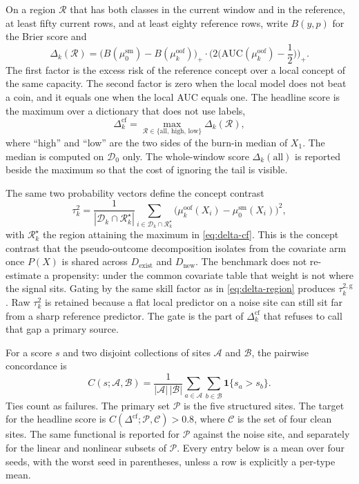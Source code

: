 On a region $\mathcal{R}$ that has both classes in the current window and
in the reference, at least fifty current rows, and at least eighty
reference rows, write $B(y,p)$ for the Brier score and
\begin{equation}
\label{eq:delta-region}
\Delta_k(\mathcal{R})
=
\Big(B(\mu_0^{\mathrm{sm}})-B(\mu_k^{\mathrm{oof}})\Big)_+
\cdot
\Big(2\big(\mathrm{AUC}(\mu_k^{\mathrm{oof}})-{\textstyle\frac12}\big)\Big)_+.
\end{equation}
The first factor is the excess risk of the reference concept over a local
concept of the same capacity.
The second factor is zero when the local model does not beat a coin, and
it equals one when the local AUC equals one.
The headline score is the maximum over a dictionary that does not use
labels,
\begin{equation}
\label{eq:delta-cf}
\Delta_k^{\mathrm{cf}}
=
\max_{\mathcal{R}\in\{\mathrm{all},\,\mathrm{high},\,\mathrm{low}\}}
\Delta_k(\mathcal{R}),
\end{equation}
where ``high'' and ``low'' are the two sides of the burn-in median of
$X_1$.
The median is computed on $\mathcal{D}_0$ only.
The whole-window score $\Delta_k(\mathrm{all})$ is reported beside the
maximum so that the cost of ignoring the tail is visible.

The same two probability vectors define the concept contrast
\begin{equation}
\label{eq:tau}
\tau_k^2
=
\frac{1}{|\mathcal{D}_k\cap\mathcal{R}_k^\star|}
\sum_{i\in\mathcal{D}_k\cap\mathcal{R}_k^\star}
\big(\mu_k^{\mathrm{oof}}(X_i)-\mu_0^{\mathrm{sm}}(X_i)\big)^2,
\end{equation}
with $\mathcal{R}_k^\star$ the region attaining the maximum in
\eqref{eq:delta-cf}.
This is the concept contrast that the pseudo-outcome decomposition isolates
from the covariate arm once $P(X)$ is shared across $D_{\mathrm{exist}}$
and $D_{\mathrm{new}}$.
The benchmark does not re-estimate a propensity: under the common
covariate table that weight is not where the signal sits.
Gating by the same skill factor as in \eqref{eq:delta-region} produces
$\tau_k^{2,\mathrm{g}}$.
Raw $\tau_k^2$ is retained because a flat local predictor on a noise site
can still sit far from a sharp reference predictor.
The gate is the part of $\Delta_k^{\mathrm{cf}}$ that refuses to call that
gap a primary source.

For a score $s$ and two disjoint collections of sites $\mathcal{A}$ and
$\mathcal{B}$, the pairwise concordance is
\begin{equation}
\label{eq:concordance}
C(s;\mathcal{A},\mathcal{B})
=
\frac{1}{|\mathcal{A}|\,|\mathcal{B}|}
\sum_{a\in\mathcal{A}}\sum_{b\in\mathcal{B}}
\mathbf{1}\{s_a>s_b\}.
\end{equation}
Ties count as failures.
The primary set $\mathcal{P}$ is the five structured sites.
The target for the headline score is
$C(\Delta^{\mathrm{cf}};\mathcal{P},\mathcal{C})>0.8$,
where $\mathcal{C}$ is the set of four clean sites.
The same functional is reported for $\mathcal{P}$ against the noise site,
and separately for the linear and nonlinear subsets of $\mathcal{P}$.
Every entry below is a mean over four seeds, with the worst seed in
parentheses, unless a row is explicitly a per-type mean.

